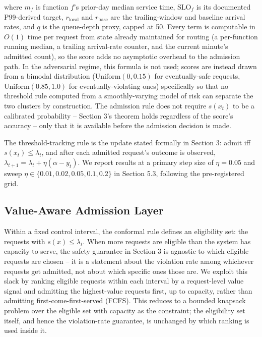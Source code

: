 \documentclass[11pt,letterpaper]{article}
\begin{document}
where $m_f$ is function $f$'s prior-day median service time, $\mathrm{SLO}_f$ is its documented P99-derived target, $r_{\text{local}}$ and $r_{\text{base}}$ are the trailing-window and baseline arrival rates, and $q$ is the queue-depth proxy, capped at 50. Every term is computable in $O(1)$ time per request from state already maintained for routing (a per-function running median, a trailing arrival-rate counter, and the current minute's admitted count), so the score adds no asymptotic overhead to the admission path. In the adversarial regime, this formula is not used; scores are instead drawn from a bimodal distribution ($\mathrm{Uniform}(0, 0.15)$ for eventually-safe requests, $\mathrm{Uniform}(0.85, 1.0)$ for eventually-violating ones) specifically so that no threshold rule computed from a smoothly-varying model of risk can separate the two clusters by construction. The admission rule does not require $s(x_t)$ to be a calibrated probability -- Section 3's theorem holds regardless of the score's accuracy -- only that it is available before the admission decision is made.

The threshold-tracking rule is the update stated formally in Section 3: admit iff $s(x_t) \le \lambda_t$, and after each admitted request's outcome is observed, $\lambda_{t+1} = \lambda_t + \eta (\alpha - y_t)$. We report results at a primary step size of $\eta = 0.05$ and sweep $\eta \in \{0.01, 0.02, 0.05, 0.1, 0.2\}$ in Section 5.3, following the pre-registered grid.

\subsection{Value-Aware Admission Layer}

Within a fixed control interval, the conformal rule defines an eligibility set: the requests with $s(x) \le \lambda_t$. When more requests are eligible than the system has capacity to serve, the safety guarantee in Section 3 is agnostic to which eligible requests are chosen -- it is a statement about the violation rate among whichever requests get admitted, not about which specific ones those are. We exploit this slack by ranking eligible requests within each interval by a request-level value signal and admitting the highest-value requests first, up to capacity, rather than admitting first-come-first-served (FCFS). This reduces to a bounded knapsack problem over the eligible set with capacity as the constraint; the eligibility set itself, and hence the violation-rate guarantee, is unchanged by which ranking is used inside it.
\end{document}
